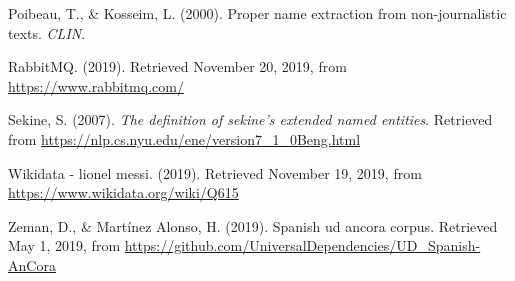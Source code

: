 \documentclass[12pt,a4paper,]{scrartcl}
\begin{document}
\leavevmode\hypertarget{ref-Poibeau2000ProperNE}{}%
Poibeau, T., \& Kosseim, L. (2000). Proper name extraction from non-journalistic texts. \emph{CLIN}.

\leavevmode\hypertarget{ref-rabbitmq}{}%
RabbitMQ. (2019). Retrieved November 20, 2019, from \url{https://www.rabbitmq.com/}

\leavevmode\hypertarget{ref-Sekine-NER}{}%
Sekine, S. (2007). \emph{The definition of sekine's extended named entities}. Retrieved from \url{https://nlp.cs.nyu.edu/ene/version7_1_0Beng.html}

\leavevmode\hypertarget{ref-wikidata_messi}{}%
Wikidata - lionel messi. (2019). Retrieved November 19, 2019, from \url{https://www.wikidata.org/wiki/Q615}

\leavevmode\hypertarget{ref-ancora-es}{}%
Zeman, D., \& Martínez Alonso, H. (2019). Spanish ud ancora corpus. Retrieved May 1, 2019, from \url{https://github.com/UniversalDependencies/UD_Spanish-AnCora}
\end{document}
